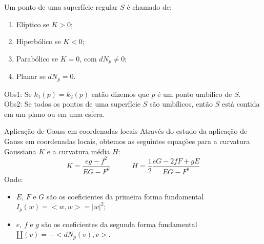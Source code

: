 \documentclass[blue]{beamer}
\begin{document}
\begin{frame}
\justify
\hspace{0.2cm}Um ponto de uma superfície regular $S$ é chamado de:
\begin{enumerate}
	\item Elíptico se $K > 0$;
	\item Hiperbólico se $K < 0$;
	\item Parabólico se $K = 0$, com $dN_p \neq 0$;
	\item Planar se $dN_p = 0$. 
\end{enumerate}
Obs1: Se $k_1(p) = k_2(p)$ então dizemos que $p$ é um ponto umbílico de $S$. \\
Obs2: Se todos os pontos de uma superfície $S$ são umbílicos, então $S$ está contida em um plano ou em uma esfera.
\end{frame}

\begin{frame}{Aplicação de Gauss em coordenadas locais}
\justify
\hspace{0.2cm}Através do estudo da aplicação de Gauss em coordenadas locais, obtemos as seguintes equações para a curvatura Gaussiana $K$ e a curvatura média $H$:
$$
K=\frac{eg-f^2}{EG-F^2} \quad \quad \quad H=\frac{1}{2}\frac{eG-2fF+gE}{EG-F^2} 
$$
Onde:
\begin{itemize}
	\justifying
	\item $E$, $F$ e $G$ são os coeficientes da primeira forma fundamental $I_p(w)= <w,w> = |w|^2$;
	\item $e$, $f$ e $g$ são os coeficientes da segunda forma fundamental $\amalg(v) = - < dN_p(v), v>$.
\end{itemize}

\end{frame}
\end{document}
